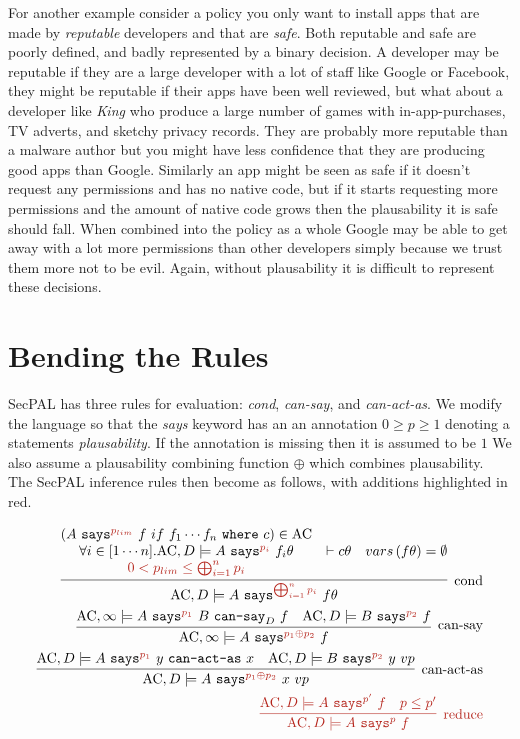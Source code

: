 \documentclass[a4paper]{article}
\newcommand{\new}[1]{{\color{BrickRed} #1}}
\newcommand{\ac}[0]{\ensuremath\text{AC}}
\newcommand{\secpalmath}[1]{\ensuremath\texttt{#1}}
\newcommand{\says}[1]{\secpalmath{says}^{\new{#1}}}
\newcommand{\canSay}[1]{\secpalmath{can-say}_{#1}}
\newcommand{\canActAs}[0]{\secpalmath{can-act-as}}
\newcommand{\where}[0]{\secpalmath{where}}
\begin{document}
For another example consider a policy you only want to install apps that are made by \emph{reputable} developers and that are \emph{safe}.
Both reputable and safe are poorly defined, and badly represented by a binary decision.
A developer may be reputable if they are a large developer with a lot of staff like Google or Facebook, they might be reputable if their apps have been well reviewed, but what about a developer like \emph{King} who produce a large number of games with in-app-purchases, TV adverts, and sketchy privacy records.  They are probably more reputable than a malware author but you might have less confidence that they are producing good apps than Google.  Similarly an app might be seen as safe if it doesn't request any permissions and has no native code, but if it starts requesting more permissions and the amount of native code grows then the plausability it is safe should fall. 
When combined into the policy as a whole Google may be able to get away with a lot more permissions than other developers simply because we trust them more not to be evil.
Again, without plausability it is difficult to represent these decisions.

\section{Bending the Rules}

SecPAL has three rules for evaluation: \emph{cond}, \emph{can-say}, and \emph{can-act-as}.
We modify the language so that the \emph{says} keyword has an an annotation $0 \geq p \geq 1$ denoting a statements \emph{plausability}.
If the annotation is missing then it is assumed to be $1$
We also assume a plausability combining function $\oplus$ which combines plausability.
The SecPAL inference rules then become as follows, with additions highlighted in \new{red}. 

\begin{eqnarray}
  \infer[\text{cond}]{
    \ac, D \models A~\says{\bigoplus_{i=1}^n p_i}~f\theta
  }{
    \begin{matrix}{
      \left(A~\says{p_{lim}}~f~if~f_1\cdots f_n~\where~c\right) \in \ac
    }\\{
      \forall i \in [1\cdots n]. \ac, D \models A~\says{p_i}~f_i\theta
    }\\\new{
      0 < p_{lim} \leq \bigoplus_{i=1}^n p_i
    }
    \end{matrix}&
    \vdash c\theta &
    vars\left(f\theta\right) = \emptyset
  }
  \\
  \infer[\text{can-say}]{
    \ac, \infty \models A~\says{p_1 \oplus p_2}~f
  }{
    \ac, \infty \models A~\says{p_1}~B~\canSay{D}~f &
    \ac, D \models B~\says{p_2}~f
  }
  \\
  \infer[\text{can-act-as}]{
    \ac, D \models A~\says{p_1 \oplus p_2}~x~vp
  }{
    \ac, D \models A~\says{p_1}~y~\canActAs~x &
    \ac, D \models B~\says{p_2}~y~vp
  }
  \\
  \new{
    \infer[\text{reduce}]{
        \ac, D \models A~\says{p}~f
    }{
        \ac, D \models A~\says{p^\prime}~f & p \leq p^\prime
    }
  }
\end{eqnarray}
\end{document}
